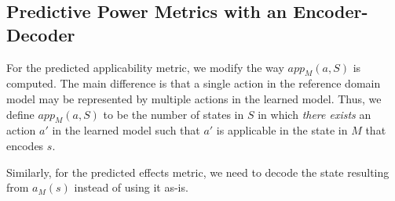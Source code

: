 \documentclass{article}
\theoremstyle{definition}
\theoremstyle{remark}
\newcommand{\app}{\ensuremath{\textit{app}}\xspace}
\newif\ifaddcomments
\newcommand{\roni}[1]{\ifaddcomments{\textcolor{red}{[Roni: #1]}}\fi}
\begin{document}
    
    





\subsection{Predictive Power Metrics with an Encoder-Decoder}
For the predicted applicability metric, we modify the way $\app_M(a,S)$ is computed. The main difference is that a single action in the reference domain model may be represented by multiple actions in the learned model. 
Thus, we define 
$\app_M(a,S)$ to be the number of states in $S$ in which \emph{there exists} an action $a'$ in the learned model such that $a'$ is applicable in the state in $M$ that encodes $s$. 

\roni{TODO: Add a formal definition of the $app_M$ method using the encoder and decoder methods}

Similarly, for the predicted effects metric, we need to decode the state resulting from $a_M(s)$ instead of using it as-is. 

\roni{TODO: Add a formal definition of the $app_M$ method using the encoder and decoder methods}
\end{document}
